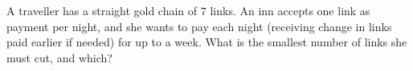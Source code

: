 A traveller has a straight gold chain of $7$ links. An inn accepts one link as payment per night, and she wants to pay each night (receiving change in links paid earlier if needed) for up to a week. What is the smallest number of links she must cut, and which?

